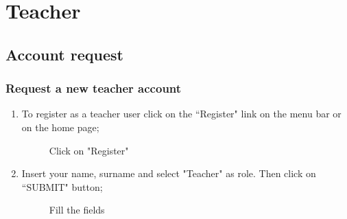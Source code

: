 \documentclass[ManualeUtente]{subfiles}
\begin{document}
\chapter{Teacher}
\section{Account request}
\subsection{Request a new teacher account}
\begin{enumerate}
	\item To register as a teacher user click on the \textquotedblleft Register" link on the menu bar or on the home page;
	\begin{figure}[H]
		\centering
		\caption{Click on "Register"}
		\label{fig:Click on "Register"}
	\end{figure} \newpage
	\item Insert your name, surname and select "Teacher" as role. Then click on \textquotedblleft SUBMIT" button;
	\begin{figure}[H]
		\centering
		\caption{Fill the fields}
		\label{fig:Fill the fields}
	\end{figure}
	
\end{enumerate}
\newpage
\end{document}
